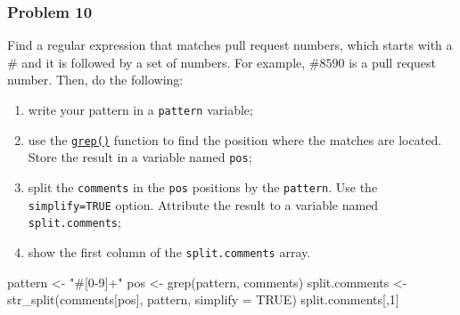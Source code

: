 \documentclass[
]{article}
\newenvironment{Shaded}{\begin{snugshade}}{\end{snugshade}}
\newcommand{\AttributeTok}[1]{\textcolor[rgb]{0.77,0.63,0.00}{#1}}
\newcommand{\ConstantTok}[1]{\textcolor[rgb]{0.00,0.00,0.00}{#1}}
\newcommand{\DecValTok}[1]{\textcolor[rgb]{0.00,0.00,0.81}{#1}}
\newcommand{\FunctionTok}[1]{\textcolor[rgb]{0.00,0.00,0.00}{#1}}
\newcommand{\NormalTok}[1]{#1}
\newcommand{\OtherTok}[1]{\textcolor[rgb]{0.56,0.35,0.01}{#1}}
\newcommand{\StringTok}[1]{\textcolor[rgb]{0.31,0.60,0.02}{#1}}
\providecommand{\tightlist}{%
  \setlength{\itemsep}{0pt}\setlength{\parskip}{0pt}}
\begin{document}
\hypertarget{problem-10}{%
\subsubsection{Problem 10}\label{problem-10}}

Find a regular expression that matches pull request numbers, which
starts with a \# and it is followed by a set of numbers. For example,
\(\#8590\) is a pull request number. Then, do the following:

\begin{enumerate}
\def\labelenumi{\arabic{enumi}.}
\tightlist
\item
  write your pattern in a \texttt{pattern} variable;
\item
  use the
  \href{https://www.rdocumentation.org/packages/base/versions/3.6.2/topics/grep}{\texttt{grep()}}
  function to find the position where the matches are located. Store the
  result in a variable named \texttt{pos};
\item
  split the \texttt{comments} in the \texttt{pos} positions by the
  \texttt{pattern}. Use the \texttt{simplify=TRUE} option. Attribute the
  result to a variable named \texttt{split.comments};
\item
  show the first column of the \texttt{split.comments} array.
\end{enumerate}

\begin{Shaded}
\begin{Highlighting}[]
\NormalTok{pattern }\OtherTok{\textless{}{-}} \StringTok{"\#[0{-}9]+"}
\NormalTok{pos }\OtherTok{\textless{}{-}} \FunctionTok{grep}\NormalTok{(pattern, comments)}
\NormalTok{split.comments }\OtherTok{\textless{}{-}} \FunctionTok{str\_split}\NormalTok{(comments[pos], pattern, }\AttributeTok{simplify =} \ConstantTok{TRUE}\NormalTok{)}
\NormalTok{split.comments[,}\DecValTok{1}\NormalTok{]}
\end{Highlighting}
\end{Shaded}
\end{document}
